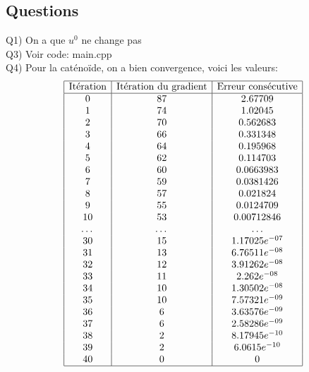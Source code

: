 \documentclass[a4paper, 11pt]{article}
\begin{document}
\subsection{Questions}
Q1) On a que $u^0$ ne change pas \\

Q3) Voir code: main.cpp \\

Q4) Pour la cat\'eno\"ide, on a bien convergence, voici les valeurs: \\

$$
\begin{array}{|c|c|c|}
\hline
\text{It\'eration} & \text{It\'eration du gradient} & \text{Erreur cons\'ecutive}
 \\
\hline
0 & 87 & 2.67709 \\
1 & 74 & 1.02045 \\
2 & 70 & 0.562683 \\
3 & 66 & 0.331348 \\
4 & 64 & 0.195968 \\
5 & 62 & 0.114703 \\
6 & 60 & 0.0663983 \\
7 & 59 & 0.0381426 \\
8 & 57 & 0.021824 \\
9 & 55 & 0.0124709 \\
10 & 53 & 0.00712846 \\
\dots & \dots & \dots \\
30 & 15 & 1.17025e^{-07} \\
31 & 13 & 6.76511e^{-08} \\
32 & 12 & 3.91262e^{-08} \\
33 & 11 & 2.262e^{-08} \\
34 & 10 & 1.30502e^{-08} \\
35 & 10 & 7.57321e^{-09} \\
36 & 6 & 3.63576e^{-09} \\
37 & 6 & 2.58286e^{-09} \\
38 & 2 & 8.17945e^{-10} \\
39 & 2 & 6.0615e^{-10} \\
40 & 0 & 0 \\
\hline
\end{array}
$$
\end{document}
